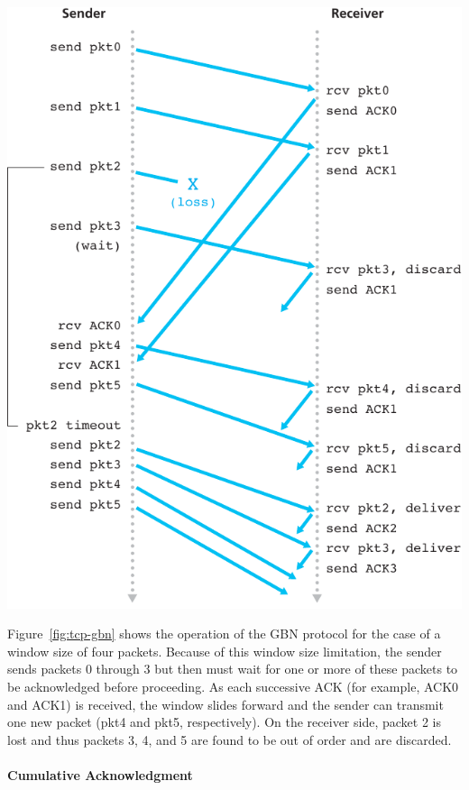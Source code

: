 \begin{minipage}{.5\linewidth}
  \includegraphics[width=\columnwidth]{tcp-gbn}\label{fig:tcp-gbn}
\end{minipage}\quad
\begin{minipage}{.5\linewidth}
  Figure~\ref{fig:tcp-gbn} shows the operation of the GBN protocol for the case of a
  window size of four packets. Because of this window size limitation, the sender sends
  packets 0 through 3 but then must wait for one or more of these packets to be
  acknowledged before proceeding. As each successive ACK (for example, ACK0 and ACK1) is
  received, the window slides forward and the sender can transmit one new packet (pkt4 and
  pkt5, respectively). On the receiver side, packet 2 is lost and thus packets 3, 4, and 5
  are found to be out of order and are discarded. 
\end{minipage}

\paragraph{Cumulative Acknowledgment}

